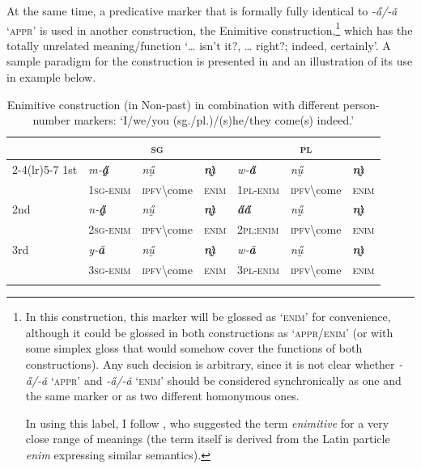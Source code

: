 \documentclass[output=paper,colorlinks,citecolor=brown]{langscibook}
\begin{document}
At the same time, a predicative marker that is formally fully identical to \textit{-a̋/-ǎ} `\textsc{appr}' is used in another construction, the Enimitive construction,\footnote{In this construction, this marker will be glossed as `\textsc{enim}' for convenience, although it could be glossed in both constructions as `\textsc{appr/enim}' (or with some simplex gloss that would somehow cover the functions of both constructions). Any such decision is arbitrary, since it is not clear whether \textit{-a̋/-ǎ} `\textsc{appr}' and \textit{-a̋/-ǎ} `\textsc{enim}' should be considered synchronically as one and the same marker or as two different homonymous ones.

In using this label, I follow \citet{panov2020}, who suggested the term \textit{enimitive} for a very close range of meanings (the term itself is derived from the Latin particle \textit{enim} expressing similar semantics).} which has the totally unrelated meaning\slash function `{\dots} isn't it?, {\dots} right?; indeed, certainly'. A sample paradigm for the construction is presented in  and an illustration of its use in example  below.


\begin{table}

\begin{tabular}{l llllll}
\lsptoprule
 & \multicolumn{3}{c}{\textsc{sg}} & \multicolumn{3}{c}{\textsc{pl}} \\ \cmidrule(lr){2-4}\cmidrule(lr){5-7}
1st & \textit{m‑\textbf{a̰̋}} & \textit{nṵ̋} & \textit{\textbf{nı̰̀}} & \textit{w‑\textbf{a̋}} & \textit{nṵ̋} & \textit{\textbf{nı̰̀}} \\
 & \textsc{1sg-enim} & \textsc{ipfv}\backslash come & \textsc{enim} & \textsc{1pl-enim} & \textsc{ipfv}\backslash come & \textsc{enim} \\ \addlinespace
2nd & \textit{n‑\textbf{a̰̋}} & \textit{nṵ̋} & \textit{\textbf{nı̰̀}} & \textit{\textbf{a̋a̋}} & \textit{nṵ̋} & \textit{\textbf{nı̰̀}} \\
 & \textsc{2sg-enim} & \textsc{ipfv}\backslash come & \textsc{enim} & \textsc{2pl:enim} & \textsc{ipfv}\backslash come & \textsc{enim} \\ \addlinespace
3rd & \textit{y‑\textbf{ǎ}} & \textit{nṵ̋} & \textit{\textbf{nı̰̀}} & \textit{w‑\textbf{ǎ}} & \textit{nṵ̋} & \textit{\textbf{nı̰̀}} \\
 & \textsc{3sg-enim} & \textsc{ipfv}\backslash come & \textsc{enim} & \textsc{3pl-enim} & \textsc{ipfv}\backslash come & \textsc{enim} \\
\lspbottomrule
\end{tabular}
\caption{Enimitive construction (in Non-past) in combination with different person-number markers: `I/we/you (sg./pl.)/(s)he/they come(s) indeed.'}
\label{tab3}
\end{table}
\end{document}
